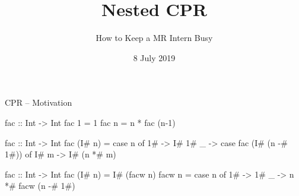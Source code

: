 \documentclass{haskellbeamer}
\title{Nested CPR}
\subtitle{How to Keep a MR Intern Busy}
\date{8 July 2019}
\begin{document}
\maketitle

\begin{frame}[fragile]{CPR -- Motivation}
  \begin{center}
    \begin{minipage}{0.7\textwidth}
      \begin{overprint}
        \begin{haskell}
          fac :: Int -> Int
          fac 1 = 1
          fac n = n * fac (n-1) 
        \end{haskell}
        \begin{haskell}
          fac :: Int -> Int
          fac (I# n) = case n of
            1# -> I# 1#
            _  -> case fac (I# (n -# 1#)) of
              I# m -> I# (n *# m)
        \end{haskell}
        \begin{haskell}
          fac :: Int -> Int
          fac (I# n) = I# (facw n)
          facw n = case n of
            1# -> 1#
            _  -> n *# facw (n -# 1#)
        \end{haskell}
      \end{overprint}
    \end{minipage}
  \end{center}
\end{frame}
\end{document}
